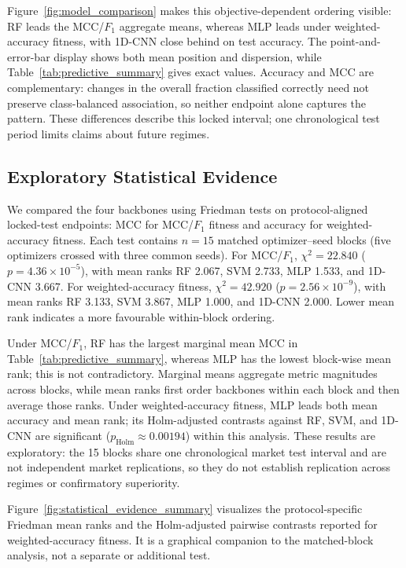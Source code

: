 Figure~\ref{fig:model_comparison} makes this objective-dependent ordering visible: RF leads the MCC/$F_1$ aggregate means, whereas MLP leads under weighted-accuracy fitness, with 1D-CNN close behind on test accuracy. The point-and-error-bar display shows both mean position and dispersion, while Table~\ref{tab:predictive_summary} gives exact values. Accuracy and MCC are complementary: changes in the overall fraction classified correctly need not preserve class-balanced association, so neither endpoint alone captures the pattern. These differences describe this locked interval; one chronological test period limits claims about future regimes.

\subsection{Exploratory Statistical Evidence}

We compared the four backbones using Friedman tests on protocol-aligned locked-test endpoints: MCC for MCC/$F_1$ fitness and accuracy for weighted-accuracy fitness. Each test contains $n=15$ matched optimizer--seed blocks (five optimizers crossed with three common seeds). For MCC/$F_1$, $\chi^2=22.840$ ($p=4.36\times10^{-5}$), with mean ranks RF 2.067, SVM 2.733, MLP 1.533, and 1D-CNN 3.667. For weighted-accuracy fitness, $\chi^2=42.920$ ($p=2.56\times10^{-9}$), with mean ranks RF 3.133, SVM 3.867, MLP 1.000, and 1D-CNN 2.000. Lower mean rank indicates a more favourable within-block ordering.

Under MCC/$F_1$, RF has the largest marginal mean MCC in Table~\ref{tab:predictive_summary}, whereas MLP has the lowest block-wise mean rank; this is not contradictory. Marginal means aggregate metric magnitudes across blocks, while mean ranks first order backbones within each block and then average those ranks. Under weighted-accuracy fitness, MLP leads both mean accuracy and mean rank; its Holm-adjusted contrasts against RF, SVM, and 1D-CNN are significant ($p_{\mathrm{Holm}}\approx0.00194$) within this analysis. These results are exploratory: the 15 blocks share one chronological market test interval and are not independent market replications, so they do not establish replication across regimes or confirmatory superiority.

Figure~\ref{fig:statistical_evidence_summary} visualizes the protocol-specific Friedman mean ranks and the Holm-adjusted pairwise contrasts reported for weighted-accuracy fitness. It is a graphical companion to the matched-block analysis, not a separate or additional test.

